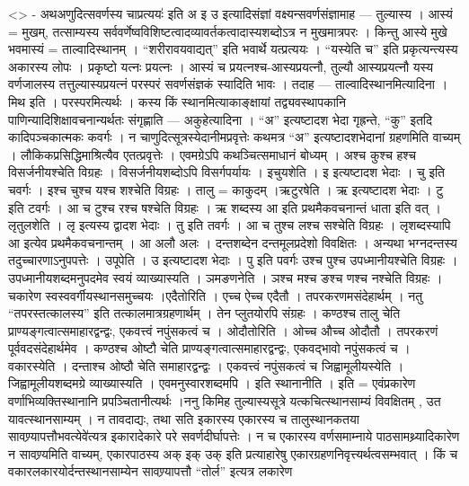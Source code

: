 \textless{}\textgreater{} - अथअणुदित्सवर्णस्य चाप्रत्ययः॑ इति अ इ उ
इत्यादिसंज्ञां वक्ष्यन्सवर्णसंज्ञामाह --- तुल्यास्य । आस्यं = मुखम्,
तत्साम्यस्य सर्ववर्णेष्वविशिष्टत्वादव्यावर्तकत्वादास्यशब्दोऽत्र न
मुखमात्रपरः । किन्तु आस्ये मुखे भवमास्यं = ताल्वादिस्थानम् ।
``शरीरावयवाद्यत्'' इति भवार्थे यत्प्रत्ययः । ``यस्येति च'' इति
प्रकृत्यन्त्यस्य अकारस्य लोपः । प्रकृष्टो यत्नः प्रयत्नः । आस्यं च
प्रयत्नश्च-आस्यप्रयत्नौ, तुल्यौ आस्यप्रयत्नौ यस्य वर्णजालस्य
तत्तुल्यास्यप्रयत्नं परस्परं सवर्णसंज्ञकं स्यादिति भावः । तदाह ---
ताल्वादिस्थानमित्यादिना । मिथ इति । परस्परमित्यर्थः । कस्य किं
स्थानमित्याकाङ्क्षायां तद्व्यवस्थापकानि पाणिन्यादिशिक्षावचनान्यर्थतः
संगृह्णाति --- अकुहेत्यादिना । ``अ'' इत्यष्टादश भेदा गृह्रन्ते, ``कु''
इतदि कादिपञ्चकात्मकः कवर्गः । न चाणुदित्सूत्रस्येदानीमप्रवृत्तेः कथमत्र
``अ'' इत्यष्टादशभेदानां ग्रहणमिति वाच्यम् । लौकिकप्रसिद्धिमाश्रित्यैव
एतत्प्रवृत्तेः । एवमग्रेऽपि कथञ्चित्समाधानं बोध्यम् । अश्च कुश्च हश्च
विसर्जनीयश्चेति विग्रहः । विसर्जनीयशब्दोऽपि विसर्गपर्यायः । इचुयशेति । इ
इत्यष्टादश भेदाः । चु इति चवर्गः । इश्च चुश्च यश्च शश्चेति विग्रहः ।
तालु = काकुदम् ।ऋटुरषेति । ऋ इत्यष्टादश भेदाः । टु इति टवर्गः । आ च
टुश्च रश्च षश्चेति विग्रहः । ऋ शब्दस्य आ इति प्रथमैकवचनान्तं धाता इति
वत् । लृतुलशेति । लृ इत्यस्य द्वादश भेदाः । तु इति तवर्गः । आ च तुश्च
लश्च सश्चेति विग्रहः । लृशब्दस्यापि आ इत्येव प्रथमैकवचनान्तम् । आ अलौ
अलः । दन्तशब्देन दन्तमूलप्रदेशो विवक्षितः । अन्यथा भग्नदन्तस्य
तदुच्चारणाऽनुपपत्तेः । उपूपेति । उ इत्यष्टादश भेदाः । पु इति पवर्गः उश्च
पुश्च उपध्मानीयश्चेति विग्रहः । उपध्मानीयशब्दमनुपदमेव स्वयं
व्याख्यास्यति । ञमङणनेति । ञश्च मश्च ङश्च णश्च नश्चेति विग्रहः । चकारेण
स्वस्ववर्गीयस्थानसमुच्चयः ।एदैतोरिति । एच्च ऐच्च एदैतौ ।
तपरकरणमसंदेहार्थम् । नतु ``तपरस्तत्कालस्य'' इति तत्कालमात्रग्रहणार्थम् ।
तेन प्लुतयोरपि संग्रहः । कण्ठश्च तालु चेति
प्राण्यङ्गत्वात्समाहारद्वन्द्वः, एकवत्त्वं नपुंसकत्वं च । ओदौतोरिति ।
ओच्च औच्च ओदौतौ । तपरकरणं पूर्ववदसंदेहार्थमेव । कण्ठश्च ओष्टौ चेति
प्राण्यङ्गत्वात्समाहारद्वन्द्वः, एकवद्भावो नपुंसकत्वं च । वकारस्येति ।
दन्ताश्च ओष्ठौ चेति समाहारद्वन्द्वः । एकवत्त्वं नपुंसकत्वं च
जिह्वामूलीयस्येति । जिह्वामूलीयशब्दमग्रे व्याख्यास्यति ।
एवमनुस्वारशब्दमपि । इति स्थानानीति । इति = एवंप्रकारेण
वर्णाभिव्यक्तिस्थानानि प्रपञ्चितानीत्यर्थः ।ननु किमिह तुल्यास्यसूत्रे
यत्कचित्स्थानसाम्यं विवक्षितम् , उत यावत्स्थानसाम्यम् । न तावदाद्यः, तथा
सति इकारस्य एकारस्य च तालुस्थानकतया सावण्र्यापत्तौभवत्येवे॑त्यत्र
इकारादेकारे परे सवर्णदीर्घापत्तेः । न च एकारस्य वर्णसमाम्नाये
पाठसामथ्र्यादिकारेण न सावण्र्यमिति वाच्यम्, एकारपाठस्य अक् इक् उक् इति
प्रत्याहारेषु एकारग्रहणनिवृत्त्यर्थत्वसम्भवात् । किं च
वकारलकारयोर्दन्तस्थानसाम्येन सावण्र्यापत्तौ ``तोर्ल'' इत्यत्र लकारेण
